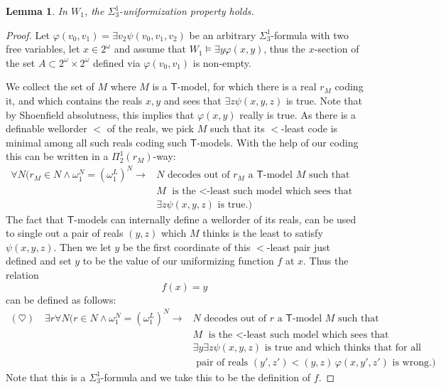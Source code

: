 \documentclass[a4paper,12pt]{article}
\newtheorem{lemma}[theorem]{Lemma}
\newcommand{\T}{\mathsf{T}}
\begin{document}
\begin{lemma}\label{uniformization}
In $W_1$, the $\Sigma^1_3$-uniformization property holds.
\end{lemma}
\begin{proof}
Let $\varphi(v_0,v_1)=\exists v_2 \psi(v_0,v_1,v_2)$ be an arbitrary $\Sigma^1_3$-formula with two free variables, let $x \in 2^{\omega}$ and assume that $W_1 \models \exists y\varphi(x,y)$, thus the $x$-section of the set $A \subset 2^{\omega} \times 2^{\omega}$ defined via $\varphi(v_0,v_1)$ is non-empty.

We collect the set of $M$ where $M$ is a $\T$-model, for which there is a real $r_M$ coding it, and which contains the reals $x,y$ and sees that $\exists z \psi (x,y,z)$ is true. Note that by Shoenfield absolutness, this implies that $\varphi(x,y)$ really is true.
As there is a definable wellorder $<$ of the reals, we pick $M$ such that its $<$-least code is minimal among all such reals coding such $\T$-models. With the help of our coding this can be written in a $\Pi^1_2(r_M)$-way:
\begin{align*}
\forall N (r_M \in N \land \omega_1^N=(\omega_1^L)^N \rightarrow
&N \text{ decodes out of } r_M \text{ a } \T \text{-model } M \text{ such that } \\& M \text{ is the $<$-least such model which sees that }\\& \exists z \psi(x,y,z) \text{ is true.})
\end{align*}
The fact that $\T$-models can internally define a wellorder of its reals, can be used to single out a pair of reals $(y,z)$ which $M$ thinks is the least to satisfy $\psi(x,y,z)$.  Then we let $y$ be the first coordinate of this $<$-least pair just defined and set $y$ to be the value of our uniformizing function $f$ at $x$.
Thus the relation $$f(x)=y$$ can be defined as follows:
\begin{align*}
(\heartsuit) \quad \exists r \forall N (r \in N \land \omega_1^N=(\omega_1^L)^N \rightarrow
&N \text{ decodes out of } r \text{ a } \T \text{-model } M \text{ such that } \\& M \text{ is the $<$-least such model which sees that }\\& \exists y\exists z \psi(x,y,z) \text{ is true and which thinks that for all} \\& \text{ pair of reals } (y',z') < (y,z)  \,\varphi(x,y',z') \text{ is wrong.} )
\end{align*}
Note that this is a $\Sigma^1_3$-formula and we take this to be the definition of $f$.


\end{proof}
\end{document}

